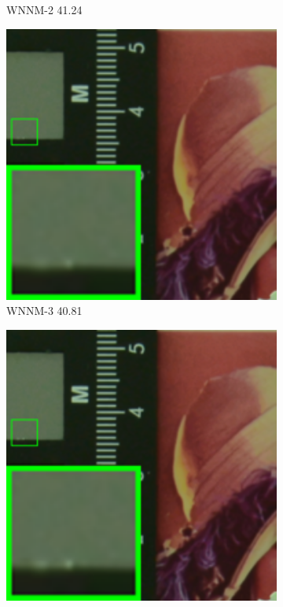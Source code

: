 \begin{figure}
\begin{subfigure}[t]{0.19\textwidth}
		\caption{WNNM-2 41.24}
    \end{subfigure}
    \hfill
    \begin{subfigure}[t]{0.19\textwidth}
        \centering
        \includegraphics[width=1\textwidth]{images/mcwnnm/cc/resize_br_WNNM_ADMM_NL_CC15_d800_iso1600_2.png}
		\caption{WNNM-3 40.81}
    \end{subfigure}
    \hfill
    \begin{subfigure}[t]{0.19\textwidth}
        \centering
        \includegraphics[width=1\textwidth]{images/mcwnnm/cc/resize_br_CWNNM_ADMM_NL_CC15_d800_iso1600_2.png}

\end{subfigure}
\end{figure}
